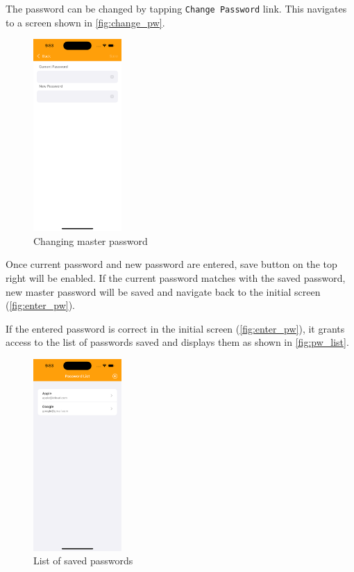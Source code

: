 \documentclass[10pt, titlepage]{article}
\begin{document}
The password can be changed by tapping \texttt{Change Password} link. This navigates to a screen shown in \autoref{fig:change_pw}.
\begin{figure}[H]
	\centering
	\vspace{-0.25em}
	\includegraphics[width=0.3\textwidth]{img/change_pw}
	\vspace{-0.75em}
	\caption{Changing master password}
	\label{fig:change_pw}
	\vspace{-0.75em}
\end{figure}
Once current password and new password are entered, save button on the top right will be enabled. If the current password matches with the saved password, new master password will be saved and navigate back to the initial screen (\autoref{fig:enter_pw}).

If the entered password is correct in the initial screen (\autoref{fig:enter_pw}), it grants access to the list of passwords saved and displays them as shown in \autoref{fig:pw_list}.
\begin{figure}[H]
	\centering
	\vspace{-0.25em}
	\includegraphics[width=0.3\textwidth]{img/pw_list}
	\vspace{-0.75em}
	\caption{List of saved passwords}
	\label{fig:pw_list}
	\vspace{-0.75em}
\end{figure}
\end{document}
